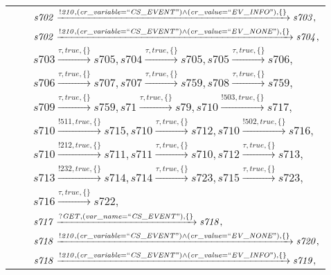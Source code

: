 \begin{tabular}{lcp{350px}}
& & $\mathit{s702}\xrightarrow{\mathit{!210}, \mathit{(cr\_variable = ``CS\_EVENT") \land (cr\_value = ``EV\_INFO")}, \{\}}\mathit{s703},$ \\
& & $\mathit{s702}\xrightarrow{\mathit{!210}, \mathit{(cr\_variable = ``CS\_EVENT") \land (cr\_value = ``EV\_NONE")}, \{\}}\mathit{s704},$ \\
& & $\mathit{s703}\xrightarrow{\mathit{\tau}, \mathit{true}, \{\}}\mathit{s705},\mathit{s704}\xrightarrow{\mathit{\tau}, \mathit{true}, \{\}}\mathit{s705},\mathit{s705}\xrightarrow{\mathit{\tau}, \mathit{true}, \{\}}\mathit{s706},$ \\
& & $\mathit{s706}\xrightarrow{\mathit{\tau}, \mathit{true}, \{\}}\mathit{s707},\mathit{s707}\xrightarrow{\mathit{\tau}, \mathit{true}, \{\}}\mathit{s759},\mathit{s708}\xrightarrow{\mathit{\tau}, \mathit{true}, \{\}}\mathit{s759},$ \\
& & $\mathit{s709}\xrightarrow{\mathit{\tau}, \mathit{true}, \{\}}\mathit{s759},\mathit{s71}\xrightarrow{\mathit{\tau}, \mathit{true}, \{\}}\mathit{s79},\mathit{s710}\xrightarrow{\mathit{!503}, \mathit{true}, \{\}}\mathit{s717},$ \\
& & $\mathit{s710}\xrightarrow{\mathit{!511}, \mathit{true}, \{\}}\mathit{s715},\mathit{s710}\xrightarrow{\mathit{\tau}, \mathit{true}, \{\}}\mathit{s712},\mathit{s710}\xrightarrow{\mathit{!502}, \mathit{true}, \{\}}\mathit{s716},$ \\
& & $\mathit{s710}\xrightarrow{\mathit{!212}, \mathit{true}, \{\}}\mathit{s711},\mathit{s711}\xrightarrow{\mathit{\tau}, \mathit{true}, \{\}}\mathit{s710},\mathit{s712}\xrightarrow{\mathit{\tau}, \mathit{true}, \{\}}\mathit{s713},$ \\
& & $\mathit{s713}\xrightarrow{\mathit{!232}, \mathit{true}, \{\}}\mathit{s714},\mathit{s714}\xrightarrow{\mathit{\tau}, \mathit{true}, \{\}}\mathit{s723},\mathit{s715}\xrightarrow{\mathit{\tau}, \mathit{true}, \{\}}\mathit{s723},$ \\
& & $\mathit{s716}\xrightarrow{\mathit{\tau}, \mathit{true}, \{\}}\mathit{s722},$ \\
& & $\mathit{s717}\xrightarrow{\mathit{?GET}, \mathit{(var\_name = ``CS\_EVENT")}, \{\}}\mathit{s718},$ \\
& & $\mathit{s718}\xrightarrow{\mathit{!210}, \mathit{(cr\_variable = ``CS\_EVENT") \land (cr\_value = ``EV\_NONE")}, \{\}}\mathit{s720},$ \\
& & $\mathit{s718}\xrightarrow{\mathit{!210}, \mathit{(cr\_variable = ``CS\_EVENT") \land (cr\_value = ``EV\_INFO")}, \{\}}\mathit{s719},$ \\

\end{tabular}
